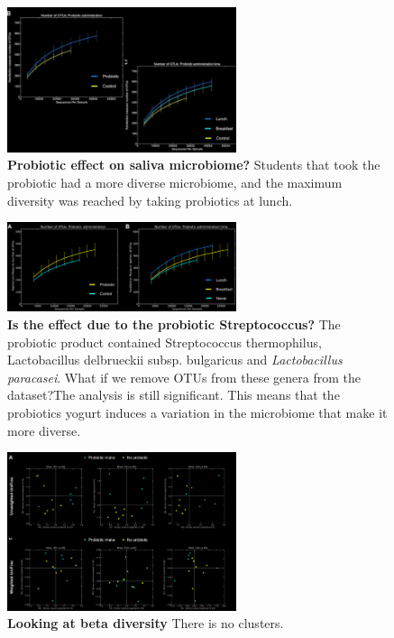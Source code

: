 \begin{figure}[h]
\centering
\includegraphics[width=0.6\textwidth]{Probiotic.png}
\caption{\textbf{Probiotic effect on saliva microbiome?} Students that took the probiotic had a more diverse microbiome, and the maximum diversity was reached by taking probiotics at lunch.}
\end{figure}

\begin{figure}[h]
\centering
\includegraphics[width=0.6\textwidth]{Probiotic2.png}
\caption{\textbf{Is the effect due to the probiotic Streptococcus?} The probiotic product contained \emph{}{Streptococcus thermophilus}, \emph{}{Lactobacillus delbrueckii subsp. bulgaricus} and
\emph{Lactobacillus paracasei}. What if we remove OTUs from these genera from the dataset?The analysis is still significant. This means that the probiotics yogurt induces a variation in the microbiome that make it more diverse.}
\end{figure}

\begin{figure}[h]
\centering
\includegraphics[width=0.6\textwidth]{BetaDiversity.png}
\caption{\textbf{Looking at beta diversity} There is no clusters.}
\end{figure}
